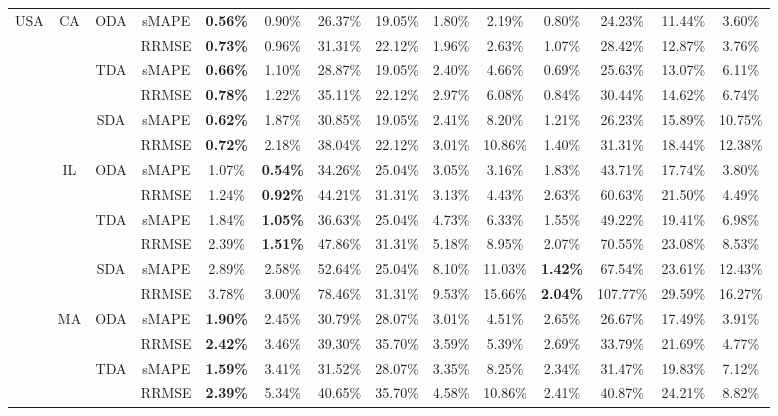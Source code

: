 {\begin{longtable}[htb!]{cccc|ccccc|ccccc}
USA & {CA} & {ODA} & sMAPE & \textbf{0.56\%} & 0.90\% & 26.37\% & 19.05\% & 1.80\% & 2.19\% & 0.80\% & 24.23\% & 11.44\% & 3.60\% \\
 &  &  & RRMSE & \textbf{0.73\%} & 0.96\% & 31.31\% & 22.12\% & 1.96\% & 2.63\% & 1.07\% & 28.42\% & 12.87\% & 3.76\% \\
 &  & {TDA} & sMAPE & \textbf{0.66\%} & 1.10\% & 28.87\% & 19.05\% & 2.40\% & 4.66\% & 0.69\% & 25.63\% & 13.07\% & 6.11\% \\
 &  &  & RRMSE & \textbf{0.78\%} & 1.22\% & 35.11\% & 22.12\% & 2.97\% & 6.08\% & 0.84\% & 30.44\% & 14.62\% & 6.74\% \\
 &  & {SDA} & sMAPE & \textbf{0.62\%} & 1.87\% & 30.85\% & 19.05\% & 2.41\% & 8.20\% & 1.21\% & 26.23\% & 15.89\% & 10.75\% \\
 &  &  & RRMSE & \textbf{0.72\%} & 2.18\% & 38.04\% & 22.12\% & 3.01\% & 10.86\% & 1.40\% & 31.31\% & 18.44\% & 12.38\% \\ \cline{2-14}
 & {IL} & {ODA} & sMAPE & 1.07\% & \textbf{0.54\%} & 34.26\% & 25.04\% & 3.05\% & 3.16\% & 1.83\% & 43.71\% & 17.74\% & 3.80\% \\
 &  &  & RRMSE & 1.24\% & \textbf{0.92\%} & 44.21\% & 31.31\% & 3.13\% & 4.43\% & 2.63\% & 60.63\% & 21.50\% & 4.49\% \\
 &  & {TDA} & sMAPE & 1.84\% & \textbf{1.05\%} & 36.63\% & 25.04\% & 4.73\% & 6.33\% & 1.55\% & 49.22\% & 19.41\% & 6.98\% \\
 &  &  & RRMSE & 2.39\% & \textbf{1.51\%} & 47.86\% & 31.31\% & 5.18\% & 8.95\% & 2.07\% & 70.55\% & 23.08\% & 8.53\% \\
 &  & {SDA} & sMAPE & 2.89\% & 2.58\% & 52.64\% & 25.04\% & 8.10\% & 11.03\% & \textbf{1.42\%} & 67.54\% & 23.61\% & 12.43\% \\
 &  &  & RRMSE & 3.78\% & 3.00\% & 78.46\% & 31.31\% & 9.53\% & 15.66\% & \textbf{2.04\%} & 107.77\% & 29.59\% & 16.27\% \\ \cline{2-14}
 & {MA} & {ODA} & sMAPE & \textbf{1.90\%} & 2.45\% & 30.79\% & 28.07\% & 3.01\% & 4.51\% & 2.65\% & 26.67\% & 17.49\% & 3.91\% \\
 &  &  & RRMSE & \textbf{2.42\%} & 3.46\% & 39.30\% & 35.70\% & 3.59\% & 5.39\% & 2.69\% & 33.79\% & 21.69\% & 4.77\% \\
 &  & {TDA} & sMAPE & \textbf{1.59\%} & 3.41\% & 31.52\% & 28.07\% & 3.35\% & 8.25\% & 2.34\% & 31.47\% & 19.83\% & 7.12\% \\
 &  &  & RRMSE & \textbf{2.39\%} & 5.34\% & 40.65\% & 35.70\% & 4.58\% & 10.86\% & 2.41\% & 40.87\% & 24.21\% & 8.82\% \\

\end{longtable}}
